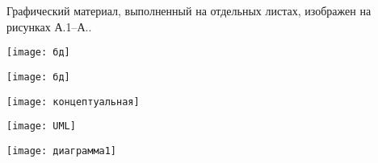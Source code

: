 
Графический материал, выполненный на отдельных листах,
изображен на рисунках А.1--А..
\setcounter{числоПлакатов}{0}

\renewcommand{\thefigure}{А.\arabic{figure}} %

\begin{landscape}

\begin{плакат}
    \texttt{[image: бд]}
    \label{pl1:image}      
\end{плакат}

\begin{плакат}
    \texttt{[image: бд]}
    \label{pl2:image}      
\end{плакат}

\begin{плакат}
    \texttt{[image: концептуальная]}
    \label{pl3:image}      
\end{плакат}

\begin{плакат}
    \texttt{[image: UML]}
    \label{pl4:image}      
\end{плакат}

\begin{плакат}
	\texttt{[image: диаграмма1]}
	\label{pl5:image}      
\end{плакат}

\end{landscape}
